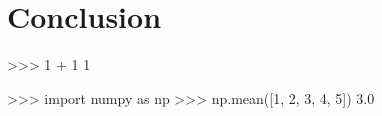 \chapter{Conclusion}\label{chapter:conclusion}

\begin{usagepy}
>>> 1 + 1
1

>>> import numpy as np
>>> np.mean([1, 2, 3, 4, 5])
3.0
\end{usagepy}